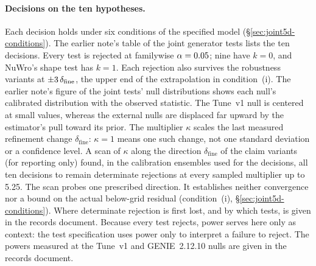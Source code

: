 \paragraph{Decisions on the ten hypotheses.} Each decision holds under six conditions of the specified model (\S\ref{sec:joint5d-conditions}). The earlier note's table of the joint generator tests lists the ten decisions. Every test is rejected at familywise $\alpha=0.05$; nine have $k=0$, and NuWro's shape test has $k=1$. Each rejection also survives the robustness variants at $\pm3\,\delta_{\mathrm{fine}}$, the upper end of the extrapolation in condition~(i). The earlier note's figure of the joint tests' null distributions shows each null's calibrated distribution with the observed statistic. The Tune~v1 null is centered at small values, whereas the external nulls are displaced far upward by the estimator's pull toward its prior. The multiplier $\kappa$ scales the last measured refinement change $\delta_{\mathrm{fine}}$: $\kappa=1$ means one such change, not one standard deviation or a confidence level. A scan of $\kappa$ along the direction $\delta_{\mathrm{fine}}$ of the claim variants~\cite{JointTestKappa2026} (for reporting only) found, in the calibration ensembles used for the decisions, all ten decisions to remain determinate rejections at every sampled multiplier up to 5.25. The scan probes one prescribed direction. It establishes neither convergence nor a bound on the actual below-grid residual (condition~(i), \S\ref{sec:joint5d-conditions}). Where determinate rejection is first lost, and by which tests, is given in the records document. Because every test rejects, power serves here only as context: the test specification uses power only to interpret a failure to reject. The powers measured at the Tune~v1 and GENIE~2.12.10 nulls are given in the records document.

